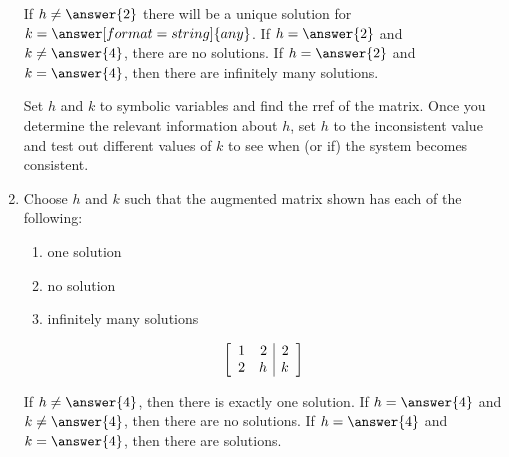 \documentclass{ximera}
\begin{document}
\begin{problem}
\begin{enumerate}
        If $h\neq \answer{2}$ there will be a unique solution for $k=\answer[format=string]{any}$. If $h=\answer{2}$ and $k\neq \answer{4}$, there are no solutions. If $h=\answer{2}$ and $k=\answer{4}$, then there are infinitely many solutions.

        \begin{hint}
        
            Set $h$ and $k$ to symbolic variables and find the rref of the matrix. Once you determine the relevant information about $h$, set $h$ to the inconsistent value and test out different values of $k$ to see when (or if) the system becomes consistent.

        \end{hint}
        
        \item Choose $h$ and $k$ such that the augmented matrix shown has each of the following:
        \begin{enumerate}
          \item one solution
          \item no solution
          \item infinitely many solutions
        \end{enumerate}
        \begin{equation*}
          \startmat{rr|r}
            1 & 2 & 2 \\
            2 & h & k
          \stopmat
        \end{equation*}
        
        If $h\neq \answer{4}$, then there is exactly one solution. If $h=\answer{4}$ and $k\neq \answer{4}$, then there are no solutions. If $h=\answer{4}$ and $k=\answer{4}$, then there are  solutions.
        
    \end{enumerate}
    

\end{problem}
\end{document}
